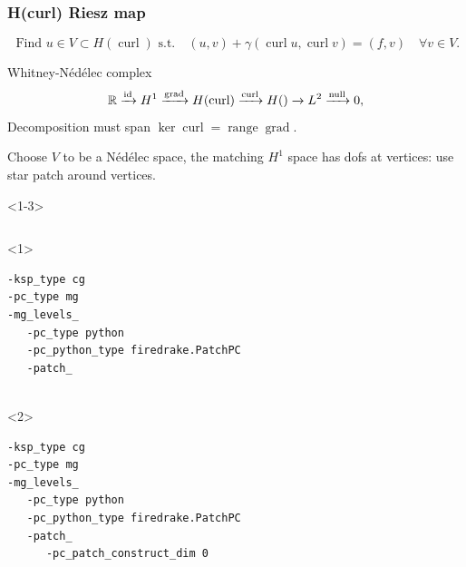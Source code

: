\documentclass[presentation,aspectratio=43, 10pt]{beamer}
\DeclareMathOperator{\grad}{grad}
\let\div\relax
\DeclareMathOperator{\div}{div}
\DeclareMathOperator{\curl}{curl}
\DeclareMathOperator{\range}{range}
\begin{document}
\begin{frame}[fragile,t]
  \frametitle{H(curl) Riesz map}
  \vspace{-1.5\baselineskip}
  \begin{equation*}
    \text{  Find $u \in V \subset H(\curl)$ s.t.} \quad (u, v) + \gamma (\curl u, \curl v) = (f, v) \quad \forall v \in V.
  \end{equation*}
  \vspace{-\baselineskip}
  \begin{block}{Whitney-N\'ed\'elec complex}
    \begin{equation*}
      \mathbb{R} \xrightarrow{\operatorname{id}} H^1 \xrightarrow{\grad} H(\curl)
      \xrightarrow{\curl} H(\div) \xrightarrow{\div} L^2 \xrightarrow{\operatorname{null}} 0,
    \end{equation*}
    Decomposition must span $\ker \curl = \range \grad$.

    Choose $V$ to be a N\'ed\'elec space, the matching $H^1$
    space has dofs at vertices: use star patch around vertices.
  \end{block}
  \begin{overlayarea}{\textwidth}{0.5\textheight}
  \begin{onlyenv}<1-3>
    \begin{columns}[T]
      \begin{column}{0.6\textwidth}
        \begin{onlyenv}<1>
\begin{verbatim}
-ksp_type cg
-pc_type mg
-mg_levels_
   -pc_type python
   -pc_python_type firedrake.PatchPC
   -patch_


\end{verbatim}
        \end{onlyenv}
        \begin{onlyenv}<2>
\begin{verbatim}
-ksp_type cg
-pc_type mg
-mg_levels_
   -pc_type python
   -pc_python_type firedrake.PatchPC
   -patch_
      -pc_patch_construct_dim 0


\end{verbatim}
\end{onlyenv}
\end{column}
\end{columns}
\end{onlyenv}
\end{overlayarea}
\end{frame}
\end{document}
